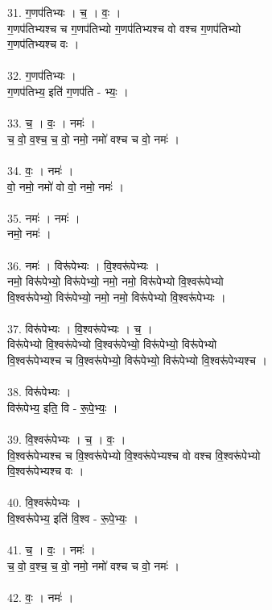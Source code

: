 31. ग॒णप॑तिभ्यः । च॒ । वः॒ ।\\
ग॒णप॑तिभ्यश्च च ग॒णप॑तिभ्यो ग॒णप॑तिभ्यश्च वो वश्च ग॒णप॑तिभ्यो\\
ग॒णप॑तिभ्यश्च वः ।\\
\\
32. ग॒णप॑तिभ्यः ।\\
ग॒णप॑तिभ्य॒ इति॑ ग॒णप॑ति - भ्यः॒ ।\\
\\
33. च॒ । वः॒ । नमः॑ ।\\
च॒ वो॒ व॒श्च॒ च॒ वो॒ नमो॒ नमो॑ वश्च च वो॒ नमः॑ ।\\
\\
34. वः॒ । नमः॑ ।\\
वो॒ नमो॒ नमो॑ वो वो॒ नमो॒ नमः॑ ।\\
\\
35. नमः॑ । नमः॑ ।\\
नमो॒ नमः॑ ।\\
\\
36. नमः॑ । विरू॑पेभ्यः । वि॒श्वरू॑पेभ्यः ।\\
नमो॒ विरू॑पेभ्यो॒ विरू॑पेभ्यो॒ नमो॒ नमो॒ विरू॑पेभ्यो वि॒श्वरू॑पेभ्यो\\
वि॒श्वरू॑पेभ्यो॒ विरू॑पेभ्यो॒ नमो॒ नमो॒ विरू॑पेभ्यो वि॒श्वरू॑पेभ्यः ।\\
\\
37. विरू॑पेभ्यः । वि॒श्वरू॑पेभ्यः । च॒ ।\\
विरू॑पेभ्यो वि॒श्वरू॑पेभ्यो वि॒श्वरू॑पेभ्यो॒ विरू॑पेभ्यो॒ विरू॑पेभ्यो\\
वि॒श्वरू॑पेभ्यश्च च वि॒श्वरू॑पेभ्यो॒ विरू॑पेभ्यो॒ विरू॑पेभ्यो वि॒श्वरू॑पेभ्यश्च ।\\
\\
38. विरू॑पेभ्यः ।\\
विरू॑पेभ्य॒ इति॒ वि - रू॒पे॒भ्यः॒ ।\\
\\
39. वि॒श्वरू॑पेभ्यः । च॒ । वः॒ ।\\
वि॒श्वरू॑पेभ्यश्च च वि॒श्वरू॑पेभ्यो वि॒श्वरू॑पेभ्यश्च वो वश्च वि॒श्वरू॑पेभ्यो\\
वि॒श्वरू॑पेभ्यश्च वः ।\\
\\
40. वि॒श्वरू॑पेभ्यः ।\\
वि॒श्वरू॑पेभ्य॒ इति॑ वि॒श्व - रू॒पे॒भ्यः॒ ।\\
\\
41. च॒ । वः॒ । नमः॑ ।\\
च॒ वो॒ व॒श्च॒ च॒ वो॒ नमो॒ नमो॑ वश्च च वो॒ नमः॑ ।\\
\\
42. वः॒ । नमः॑ ।\\
